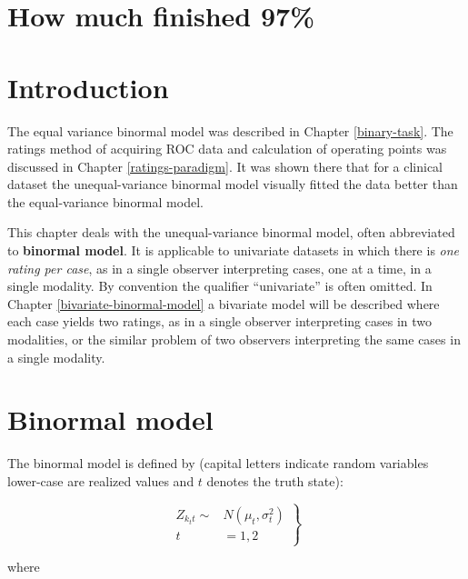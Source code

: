 \documentclass[
]{book}
\begin{document}
\hypertarget{binormal-model-how-much-finished}{%
\section{How much finished 97\%}\label{binormal-model-how-much-finished}}

\hypertarget{binormal-model-introduction}{%
\section{Introduction}\label{binormal-model-introduction}}

The equal variance binormal model was described in Chapter \ref{binary-task}. The ratings method of acquiring ROC data and calculation of operating points was discussed in Chapter \ref{ratings-paradigm}. It was shown there that for a clinical dataset the unequal-variance binormal model visually fitted the data better than the equal-variance binormal model.

This chapter deals with the unequal-variance binormal model, often abbreviated to \textbf{binormal model}. It is applicable to univariate datasets in which there is \emph{one rating per case}, as in a single observer interpreting cases, one at a time, in a single modality. By convention the qualifier ``univariate'' is often omitted. In Chapter \ref{bivariate-binormal-model} a bivariate model will be described where each case yields two ratings, as in a single observer interpreting cases in two modalities, or the similar problem of two observers interpreting the same cases in a single modality.

\hypertarget{binormal-model-definition}{%
\section{Binormal model}\label{binormal-model-definition}}

The binormal model is defined by (capital letters indicate random variables lower-case are realized values and \(t\) denotes the truth state):

\begin{equation} 
\left.
\begin{aligned}
Z_{k_tt} \sim &N\left ( \mu_t,\sigma_{t}^{2} \right )\\
t&=1,2
\end{aligned}
\right \}
\label{eq:binormal-model-z-samples-1}
\end{equation}

where
\end{document}
